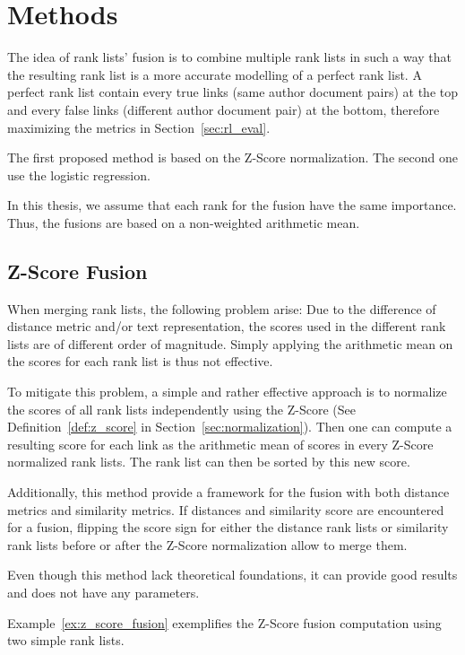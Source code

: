 \section{Methods \label{sec:rank_lists_fusion}}

The idea of rank lists' fusion is to combine multiple rank lists in such a way that the resulting rank list is a more accurate modelling of a perfect rank list.
A perfect rank list contain every true links (same author document pairs) at the top and every false links (different author document pair) at the bottom, therefore maximizing the metrics in Section~\ref{sec:rl_eval}.

The first proposed method is based on the Z-Score normalization.
The second one use the logistic regression.

In this thesis, we assume that each rank for the fusion have the same importance.
Thus, the fusions are based on a non-weighted arithmetic mean.

\subsection{Z-Score Fusion}

When merging rank lists, the following problem arise: Due to the difference of distance metric and/or text representation, the scores used in the different rank lists are of different order of magnitude.
Simply applying the arithmetic mean on the scores for each rank list is thus not effective.

To mitigate this problem, a simple and rather effective approach is to normalize the scores of all rank lists independently using the Z-Score (See Definition~\ref{def:z_score} in Section~\ref{sec:normalization}).
Then one can compute a resulting score for each link as the arithmetic mean of scores in every Z-Score normalized rank lists.
The rank list can then be sorted by this new score.

Additionally, this method provide a framework for the fusion with both distance metrics and similarity metrics.
If distances and similarity score are encountered for a fusion, flipping the score sign for either the distance rank lists or similarity rank lists before or after the Z-Score normalization allow to merge them.

Even though this method lack theoretical foundations, it can provide good results and does not have any parameters.

Example~\ref{ex:z_score_fusion} exemplifies the Z-Score fusion computation using two simple rank lists.

